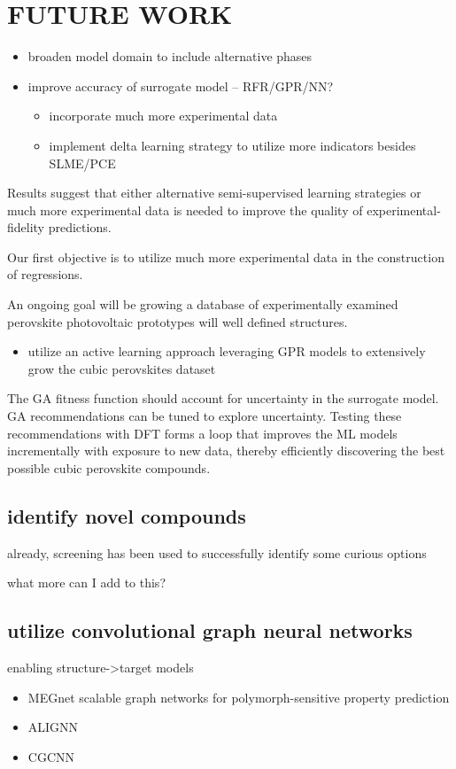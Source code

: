 \documentclass[aip, jmp, amsmath, amssymb]{revtex4-2}
\begin{document}
\section*{FUTURE WORK}
\label{sec:orgc753bce}
\begin{itemize}
\item broaden model domain to include alternative phases

\item improve accuracy of surrogate model -- RFR/GPR/NN?
\begin{itemize}
\item incorporate much more experimental data
\cite{jacobsson-2021-open-acces,briones-2021-accel-lattic}
\item implement delta learning strategy to utilize more indicators
besides SLME/PCE
\end{itemize}
\end{itemize}

Results suggest that either alternative semi-supervised learning
strategies or much more experimental data is needed to improve the
quality of experimental-fidelity predictions.

Our first objective is to utilize much more experimental data in the
construction of regressions.

An ongoing goal will be growing a database of experimentally examined
perovskite photovoltaic prototypes will well defined structures.

\begin{itemize}
\item utilize an active learning approach leveraging GPR models to
extensively grow the cubic perovskites dataset
\end{itemize}

The GA fitness function should account for uncertainty in the
surrogate model. GA recommendations can be tuned to explore
uncertainty. Testing these recommendations with DFT forms a loop that
improves the ML models incrementally with exposure to new data,
thereby efficiently discovering the best possible cubic perovskite
compounds.

\subsection*{identify novel compounds}
\label{sec:orgae066fc}
already, screening has been used to successfully identify some curious options

what more can I add to this?

\subsection*{utilize convolutional graph neural networks}
\label{sec:orga9b02ef}
enabling structure->target models
\begin{itemize}
\item MEGnet scalable graph networks for polymorph-sensitive property
prediction\cite{chen-2019-graph-networ}
\item ALIGNN\cite{choudhary-2021-atomis-line}
\item CGCNN
\end{itemize}
\end{document}
